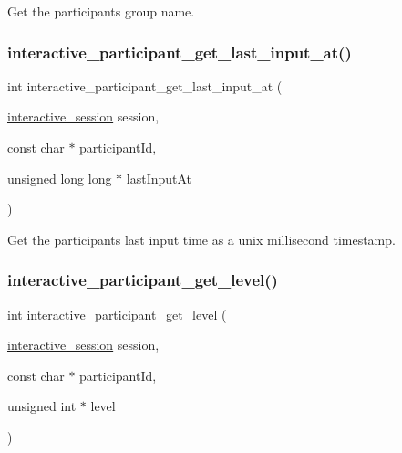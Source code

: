 Get the participant\textquotesingle{}s group name. 

\mbox{\label{group___interactivity_gadd96fb7f5e463a509ad5715298088ca3}} 
\subsubsection{\texorpdfstring{interactive\+\_\+participant\+\_\+get\+\_\+last\+\_\+input\+\_\+at()}{interactive\_participant\_get\_last\_input\_at()}}
{\footnotesize\ttfamily int interactive\+\_\+participant\+\_\+get\+\_\+last\+\_\+input\+\_\+at (\begin{DoxyParamCaption}\item[{\mbox{\hyperlink{group___interactivity_ga6d8819d38b8dc8994a2299cf22a65a31}{interactive\+\_\+session}}}]{session,  }\item[{const char $\ast$}]{participant\+Id,  }\item[{unsigned long long $\ast$}]{last\+Input\+At }\end{DoxyParamCaption})}



Get the participant\textquotesingle{}s last input time as a unix millisecond timestamp. 

\mbox{\label{group___interactivity_ga66bd07d538816cd7baaa92901c2b8f23}} 
\subsubsection{\texorpdfstring{interactive\+\_\+participant\+\_\+get\+\_\+level()}{interactive\_participant\_get\_level()}}
{\footnotesize\ttfamily int interactive\+\_\+participant\+\_\+get\+\_\+level (\begin{DoxyParamCaption}\item[{\mbox{\hyperlink{group___interactivity_ga6d8819d38b8dc8994a2299cf22a65a31}{interactive\+\_\+session}}}]{session,  }\item[{const char $\ast$}]{participant\+Id,  }\item[{unsigned int $\ast$}]{level }\end{DoxyParamCaption})}



